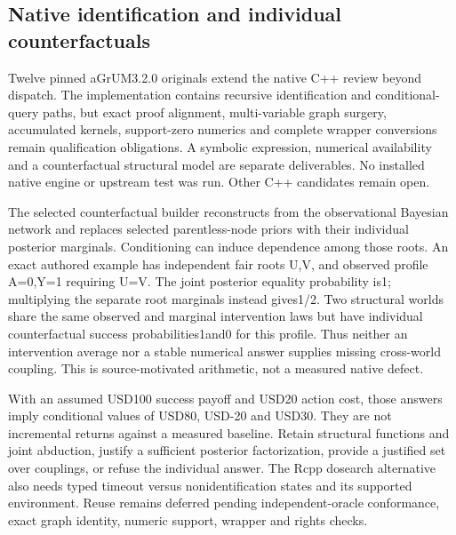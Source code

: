 \hypertarget{native-identification-and-individual-counterfactuals}{%
\subsection{Native identification and individual
counterfactuals}\label{native-identification-and-individual-counterfactuals}}

Twelve pinned aGrUM3.2.0 originals extend the native C++ review beyond
dispatch. The implementation contains recursive identification and
conditional-query paths, but exact proof alignment, multi-variable graph
surgery, accumulated kernels, support-zero numerics and complete wrapper
conversions remain qualification obligations. A symbolic expression,
numerical availability and a counterfactual structural model are
separate deliverables. No installed native engine or upstream test was
run. Other C++ candidates remain open.
\citep{exec19_cxx_identification_source}

The selected counterfactual builder reconstructs from the observational
Bayesian network and replaces selected parentless-node priors with their
individual posterior marginals. Conditioning can induce dependence among
those roots. An exact authored example has independent fair roots U,V,
and observed profile A=0,Y=1 requiring U=V. The joint posterior equality
probability is1; multiplying the separate root marginals instead
gives1/2. Two structural worlds share the same observed and marginal
intervention laws but have individual counterfactual success
probabilities1and0 for this profile. Thus neither an intervention
average nor a stable numerical answer supplies missing cross-world
coupling. This is source-motivated arithmetic, not a measured native
defect.
\citep{exec19_cxx_identification_source,exec19_cxx_identification_reference}

With an assumed USD100 success payoff and USD20 action cost, those
answers imply conditional values of USD80, USD-20 and USD30. They are
not incremental returns against a measured baseline. Retain structural
functions and joint abduction, justify a sufficient posterior
factorization, provide a justified set over couplings, or refuse the
individual answer. The Rcpp dosearch alternative also needs typed
timeout versus nonidentification states and its supported environment.
Reuse remains deferred pending independent-oracle conformance, exact
graph identity, numeric support, wrapper and rights checks.
\citep{exec19_cxx_identification_source,exec19_cxx_identification_reference}

